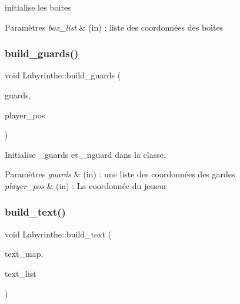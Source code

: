 initialise les boites 


\begin{DoxyParams}{Paramètres}
{\em box\+\_\+list} & (in) \+: liste des coordonnées des boites \\
\hline
\end{DoxyParams}
\mbox{\label{classLabyrinthe_a3fc2a0b2bbf0d1101fd7a3804bda9584}} 
\subsubsection{\texorpdfstring{build\+\_\+guards()}{build\_guards()}}
{\footnotesize\ttfamily void Labyrinthe\+::build\+\_\+guards (\begin{DoxyParamCaption}\item[{list$<$ \hyperlink{structcoord}{coord} $>$}]{guards,  }\item[{const \hyperlink{structcoord}{coord} \&}]{player\+\_\+pos }\end{DoxyParamCaption})\hspace{0.3cm}{\ttfamily [private]}}



Initialise \+\_\+guards et \+\_\+nguard dans la classe. 


\begin{DoxyParams}{Paramètres}
{\em guards} & (in) \+: une liste des coordonnées des gardes \\
\hline
{\em player\+\_\+pos} & (in) \+: La coordonnée du joueur \\
\hline
\end{DoxyParams}
\mbox{\label{classLabyrinthe_a719b7fe3a3e8f6be8299aab9cc1cf338}} 
\subsubsection{\texorpdfstring{build\+\_\+text()}{build\_text()}}
{\footnotesize\ttfamily void Labyrinthe\+::build\+\_\+text (\begin{DoxyParamCaption}\item[{map$<$ char, string $>$}]{text\+\_\+map,  }\item[{list$<$ tuple$<$ \hyperlink{structcoord}{coord}, char, bool $>$$>$}]{text\+\_\+list }\end{DoxyParamCaption})\hspace{0.3cm}{\ttfamily [private]}}



